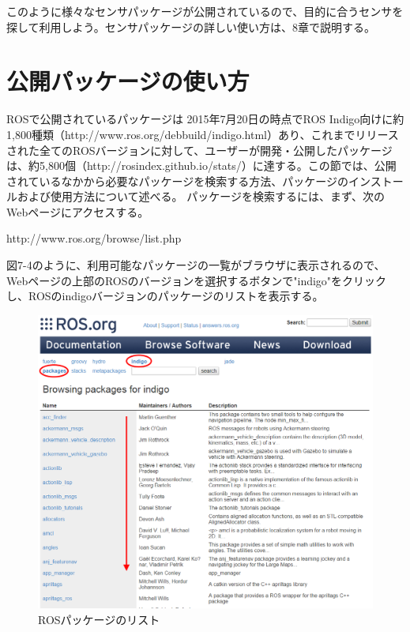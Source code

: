 このように様々なセンサパッケージが公開されているので、目的に合うセンサを探して利用しよう。センサパッケージの詳しい使い方は、8章で説明する。

\section{公開パッケージの使い方}

ROSで公開されているパッケージは 2015年7月20日の時点でROS Indigo向けに約1,800種類（http://www.ros.org/debbuild/indigo.html）あり、これまでリリースされた全てのROSバージョンに対して、ユーザーが開発・公開したパッケージは、約5,800個（http://rosindex.github.io/stats/）に達する。この節では、公開されているなかから必要なパッケージを検索する方法、パッケージのインストールおよび使用方法について述べる。
パッケージを検索するには、まず、次のWebページにアクセスする。

http://www.ros.org/browse/list.php

図7-4のように、利用可能なパッケージの一覧がブラウザに表示されるので、Webページの上部のROSのバージョンを選択するボタンで"indigo"をクリックし、ROSのindigoバージョンのパッケージのリストを表示する。

\begin{figure}[htp]
  \centering
  \includegraphics[width=\columnwidth]{pictures/chapter7/pic_07_04.png}
  \caption{ROSパッケージのリスト}
\end{figure}


